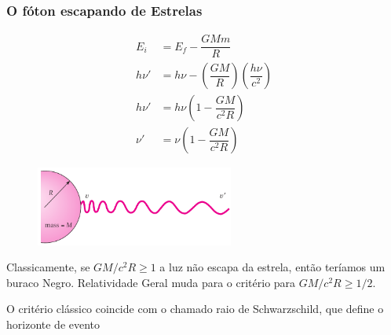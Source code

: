 \documentclass[12pt,brazil]{beamer}
\begin{document}
\begin{frame}
  \frametitle{O fóton escapando de Estrelas}
  

  \begin{multicols}{2}
    \begin{minipage}[b][20ex][t]{\linewidth}
    \fontsize{10pt}{11pt}\selectfont
      \begin{align*}
         E_i &= E_f - \dfrac{GMm}{R}\\
         h\nu' &= h\nu - \left(\dfrac{GM}{R}\right)\left(\dfrac{h\nu}{c^2}\right)\\
         h\nu' &= h\nu \left(1 - \dfrac{GM}{c^2R}\right)\\
         \nu' &= \nu \left(1 - \dfrac{GM}{c^2R}\right)
      \end{align*}
    \end{minipage}

    \begin{minipage}[b][20ex][t]{\linewidth}    
    \vspace*{0.5cm}
      \begin{figure}        
      \hspace*{1cm}\includegraphics[width=6.5cm]{figuras/fig29}
      \end{figure}
      \fontsize{8pt}{11pt}\selectfont
      
    \end{minipage}

    \begin{minipage}[b][40ex][t]{\linewidth}    
    \vspace*{0.5cm}
      \fontsize{10pt}{11pt}\selectfont
      Classicamente, se $GM/c^2R\geq 1$ a luz não escapa da estrela, então teríamos um buraco Negro.
      \vspace*{0.25cm}
      Relatividade Geral muda para o critério para $GM/c^2R\geq 1/2$.
      
      \vspace*{0.25cm}
      O critério clássico coincide com o chamado raio de Schwarzschild, que define o horizonte de evento
      
      
    \end{minipage}
  \end{multicols} 
  
\end{frame}
\end{document}
